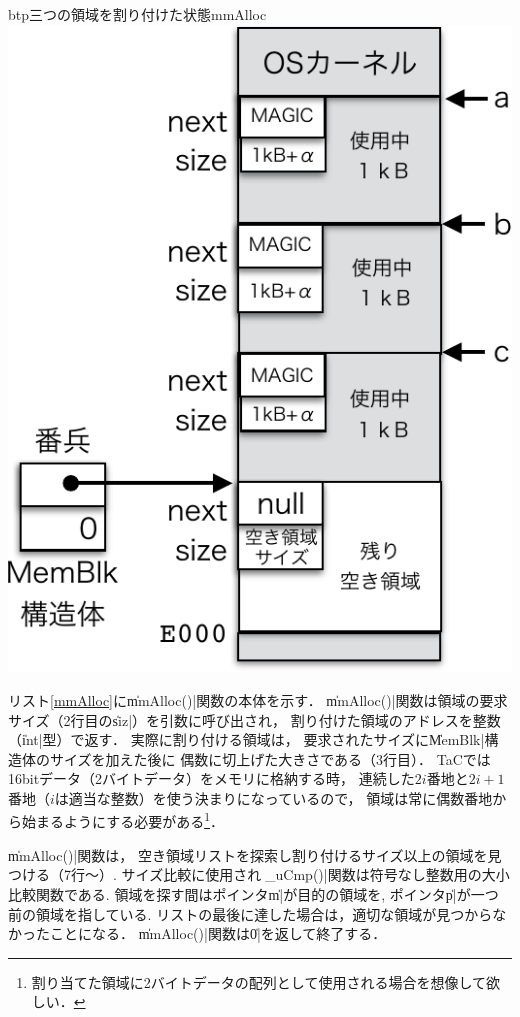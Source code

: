 \begin{myfig}{btp}{三つの領域を割り付けた状態}{mmAlloc}
  \includegraphics[scale=0.66]{Fig/mmAlloc-crop.pdf}
\end{myfig}

リスト\ref{mmAlloc}に\|mmAlloc()|関数の本体を示す．
\|mmAlloc()|関数は領域の要求サイズ（2行目の\|siz|）を引数に呼び出され，
割り付けた領域のアドレスを整数（\|int|型）で返す．
実際に割り付ける領域は，
要求されたサイズに\|MemBlk|構造体のサイズを加えた後に
偶数に切上げた大きさである（3行目）．
TaCでは16bitデータ（2バイトデータ）をメモリに格納する時，
連続した$2i$番地と$2i+1$番地（$i$は適当な整数）を使う決まりになっているので，
領域は常に偶数番地から始まるようにする必要がある\footnote{
  割り当てた領域に2バイトデータの配列として使用される場合を想像して欲しい．}．



\|mmAlloc()|関数は，
空き領域リストを探索し割り付けるサイズ以上の領域を見つける（7行〜）.
サイズ比較に使用される\|_uCmp()|関数は符号なし整数用の大小比較関数である.
領域を探す間はポインタ\|m|が目的の領域を,
ポインタ\|p|が一つ前の領域を指している.
リストの最後に達した場合は，適切な領域が見つからなかったことになる．
\|mmAlloc()|関数は\|0|を返して終了する．

